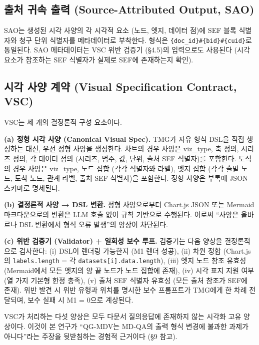 \documentclass[11pt]{article}
\begin{document}
\subsection{출처 귀속 출력 (Source-Attributed Output, SAO)}

SAO는 생성된 시각 사양의 각 시각적 요소 (노드, 엣지, 데이터 점)에 SEF 블록 식별자와 청구 단위 식별자를 메타데이터로 부착한다. 형식은 \texttt{\{doc\_id\}\#\{bid\}\#\{cuid\}}로 통일된다. SAO 메타데이터는 VSC 위반 검증기 (\S 4.5)의 입력으로도 사용된다 (시각 요소가 참조하는 SEF 식별자가 실제로 SEF에 존재하는지 확인).

\subsection{시각 사양 계약 (Visual Specification Contract, VSC)}
\label{sec:vsc}

VSC는 세 개의 결정론적 구성 요소이다.

\textbf{(a) 정형 시각 사양 (Canonical Visual Spec).} TMG가 자유 형식 DSL을 직접 생성하는 대신, 우선 정형 사양을 생성한다. 차트의 경우 사양은 viz\_type, 축 정의, 시리즈 정의, 각 데이터 점의 (시리즈, 범주, 값, 단위, 출처 SEF 식별자)를 포함한다. 도식의 경우 사양은 viz\_type, 노드 집합 (각각 식별자와 라벨), 엣지 집합 (각각 출발 노드, 도착 노드, 관계 라벨, 출처 SEF 식별자)을 포함한다. 정형 사양은 부록에 JSON 스키마로 명세된다.

\textbf{(b) 결정론적 사양 → DSL 변환.} 정형 사양으로부터 Chart.js JSON 또는 Mermaid 마크다운으로의 변환은 LLM 호출 없이 규칙 기반으로 수행된다. 이로써 ``사양은 올바르나 DSL 변환에서 형식 오류 발생''의 양상이 차단된다.

\textbf{(c) 위반 검증기 (Validator) + 일회성 보수 루프.} 검증기는 다음 양상을 결정론적으로 검사한다: (i) DSL이 렌더링 가능한지 (M1 렌더 성공), (ii) 차원 정합 (Chart.js의 \texttt{labels.length} = 각 \texttt{datasets[i].data.length}), (iii) 엣지 노드 참조 유효성 (Mermaid에서 모든 엣지의 양 끝 노드가 노드 집합에 존재), (iv) 시각 표지 지원 여부 (열 가지 기본형 한정 충족), (v) 출처 SEF 식별자 유효성 (모든 출처 참조가 SEF에 존재). 위반 발견 시 위반 유형과 위치를 명시한 보수 프롬프트가 TMG에게 한 차례 전달되며, 보수 실패 시 M1 = 0으로 계상된다.

VSC가 처리하는 다섯 양상은 모두 다문서 질의응답에 존재하지 않는 시각화 고유 양상이다. 이것이 본 연구가 ``QG-MDV는 MD-QA의 출력 형식 변경에 불과한 과제가 아니다''라는 주장을 뒷받침하는 경험적 근거이다 (\S 9 참고).

\end{document}
